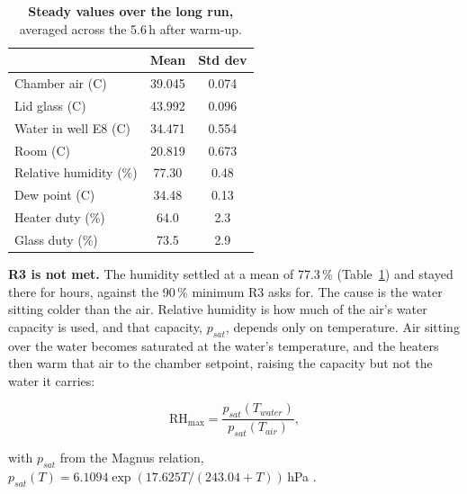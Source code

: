 \begin{table}[htbp]
    \centering
    \caption[Steady values over the long run]{\textbf{Steady values over the long run,} averaged across the 5.6\,h after warm-up.}
    \label{tab:humid-steady}
    \small
    \begin{tabular}{@{}lcc@{}}
        \toprule
        & \textbf{Mean} & \textbf{Std dev} \\
        \midrule
        Chamber air (\textdegree{}C)      & 39.045 & 0.074 \\
        Lid glass (\textdegree{}C)        & 43.992 & 0.096 \\
        Water in well E8 (\textdegree{}C) & 34.471 & 0.554 \\
        Room (\textdegree{}C)             & 20.819 & 0.673 \\
        Relative humidity (\%)            & 77.30  & 0.48 \\
        Dew point (\textdegree{}C)        & 34.48  & 0.13 \\
        \midrule
        Heater duty (\%)                  & 64.0 & 2.3 \\
        Glass duty (\%)                   & 73.5 & 2.9 \\
        \bottomrule
    \end{tabular}
\end{table}

\textbf{R3 is not met.} The humidity settled at a mean of 77.3\,\% (Table~\ref{tab:humid-steady}) and stayed there for hours, against the 90\,\% minimum R3 asks for. The cause is the water sitting colder than the air. Relative humidity is how much of the air's water capacity is used, and that capacity, $p_{sat}$, depends only on temperature. Air sitting over the water becomes saturated at the water's temperature, and the heaters then warm that air to the chamber setpoint, raising the capacity but not the water it carries:

\begin{equation}
\mathrm{RH}_{\max} = \frac{p_{sat}(T_{water})}{p_{sat}(T_{air})},
\label{eq:rh-ceiling}
\end{equation}

with $p_{sat}$ from the Magnus relation, $p_{sat}(T) = 6.1094\exp\!\left(17.625T/(243.04+T)\right)$\,hPa \citep{alduchov_improved_1996}.

